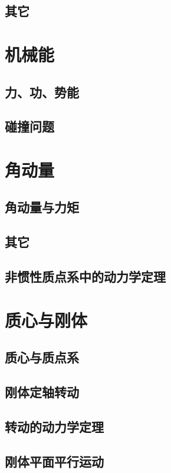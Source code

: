 \documentclass[zihao=-4,UTF8]{report}
\begin{document}
\section{其它}

\chapter{机械能}
\thispagestyle{fancy}

\section{力、功、势能}
\section{碰撞问题}

\chapter{角动量}
\thispagestyle{fancy}

\section{角动量与力矩}
\section{其它}
\section{非惯性质点系中的动力学定理}

\chapter{质心与刚体}
\thispagestyle{fancy}

\section{质心与质点系}
\section{刚体定轴转动}
\section{转动的动力学定理}
\section{刚体平面平行运动}
\end{document}
